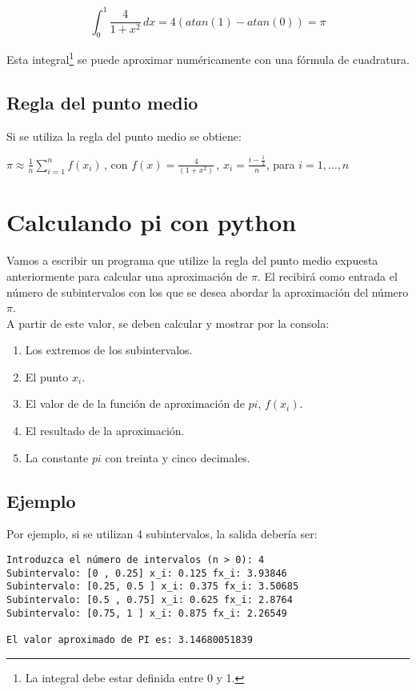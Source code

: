 \documentclass[spanish,a4paper,11pt]{article}
\begin{document}
$$\int_{0}^{1} \! \frac{4}{1+x^2}\, dx = 4(atan(1) -atan(0)) = \pi $$

Esta integral\footnote{La integral debe estar definida entre 0 y 1.} se puede aproximar numéricamente con una fórmula de cuadratura.


\subsection{Regla del punto medio}

Si se utiliza la regla del punto medio se obtiene:

\begin{center}
$ \pi \approx \frac{1}{n} \sum\limits_{i=1}^{n}f(x_i)\,$,
con $f(x) = \frac{4}{(1+x^2)}\,$,
$x_i = \frac{i - \frac{1}{2}}{n}$,
para $i = 1, \dots, n$
\end{center}


\section{Calculando pi con python}

Vamos a escribir un programa que utilize la regla del punto medio expuesta anteriormente para calcular una aproximación de $\pi$. El recibirá
como entrada el número de subintervalos con los que se desea abordar la aproximación del número $\pi$.\\

A partir de este valor, se deben calcular y mostrar por la consola:

\begin{enumerate}
  \item
    Los extremos de los subintervalos.
  \item
    El punto $x_i$.
  \item
    El valor de de la función de aproximación de $pi$, $f(x_i)$.
  \item
    El resultado de la aproximación.
  \item
    La constante $pi$ con treinta y cinco decimales.
\end{enumerate}


\subsection{Ejemplo}
Por ejemplo, si se utilizan 4 subintervalos, la salida debería ser: 
\begin{footnotesize}
\begin{verbatim}
Introduzca el número de intervalos (n > 0): 4
Subintervalo: [0 , 0.25] x_i: 0.125 fx_i: 3.93846
Subintervalo: [0.25, 0.5 ] x_i: 0.375 fx_i: 3.50685
Subintervalo: [0.5 , 0.75] x_i: 0.625 fx_i: 2.8764
Subintervalo: [0.75, 1 ] x_i: 0.875 fx_i: 2.26549

El valor aproximado de PI es: 3.14680051839
\end{verbatim}
\end{footnotesize}
\end{document}
